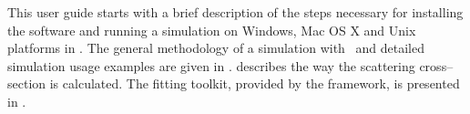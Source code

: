 


This user guide starts with a brief description of the steps necessary for 
installing the software and running a simulation 
on Windows, Mac OS X and Unix platforms in .
The general methodology of a simulation with \BornAgain\ and detailed simulation usage examples are given in . 
 describes the way the scattering cross--section is calculated.
The fitting toolkit, provided by the framework, is presented in .


%
